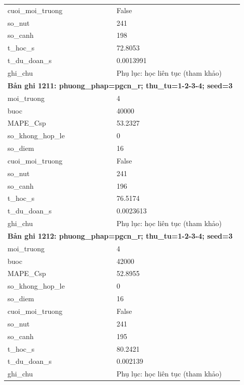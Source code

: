 \begin{longtable}{p{0.43\linewidth}p{0.50\linewidth}}
cuoi\_\allowbreak moi\_\allowbreak truong & False \\
so\_\allowbreak nut & 241 \\
so\_\allowbreak canh & 198 \\
t\_\allowbreak hoc\_\allowbreak s & 72.8053 \\
t\_\allowbreak du\_\allowbreak doan\_\allowbreak s & 0.0013991 \\
ghi\_\allowbreak chu & Phụ lục: học liên tục (tham khảo) \\
\midrule
\multicolumn{2}{p{0.95\linewidth}}{\textbf{Bản ghi 1211: phuong\_phap=pgcn\_r; thu\_tu=1-2-3-4; seed=3}} \\
moi\_\allowbreak truong & 4 \\
buoc & 40000 \\
MAPE\_\allowbreak Csp & 53.2327 \\
so\_\allowbreak khong\_\allowbreak hop\_\allowbreak le & 0 \\
so\_\allowbreak diem & 16 \\
cuoi\_\allowbreak moi\_\allowbreak truong & False \\
so\_\allowbreak nut & 241 \\
so\_\allowbreak canh & 196 \\
t\_\allowbreak hoc\_\allowbreak s & 76.5174 \\
t\_\allowbreak du\_\allowbreak doan\_\allowbreak s & 0.0023613 \\
ghi\_\allowbreak chu & Phụ lục: học liên tục (tham khảo) \\
\midrule
\multicolumn{2}{p{0.95\linewidth}}{\textbf{Bản ghi 1212: phuong\_phap=pgcn\_r; thu\_tu=1-2-3-4; seed=3}} \\
moi\_\allowbreak truong & 4 \\
buoc & 42000 \\
MAPE\_\allowbreak Csp & 52.8955 \\
so\_\allowbreak khong\_\allowbreak hop\_\allowbreak le & 0 \\
so\_\allowbreak diem & 16 \\
cuoi\_\allowbreak moi\_\allowbreak truong & False \\
so\_\allowbreak nut & 241 \\
so\_\allowbreak canh & 195 \\
t\_\allowbreak hoc\_\allowbreak s & 80.2421 \\
t\_\allowbreak du\_\allowbreak doan\_\allowbreak s & 0.002139 \\
ghi\_\allowbreak chu & Phụ lục: học liên tục (tham khảo) \\

\end{longtable}
